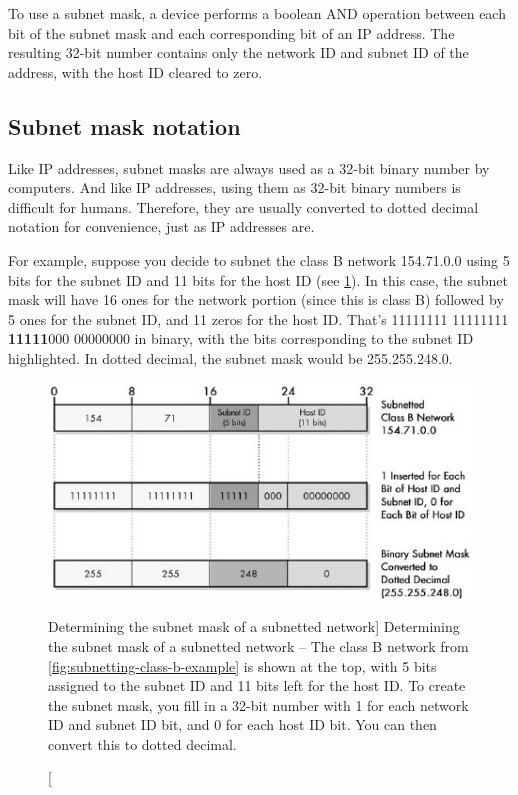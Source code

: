 \begin{keyconcept}
To use a subnet mask, a device performs a boolean AND operation between each bit of the subnet mask and each corresponding bit of an IP address.
The resulting 32-bit number contains only the network ID and subnet ID of the address, with the host ID cleared to zero.
\end{keyconcept}


\subsection{Subnet mask notation}

Like IP addresses, subnet masks are always used as a 32-bit binary number by computers.
And like IP addresses, using them as 32-bit binary numbers is difficult for humans.
Therefore, they are usually converted to dotted decimal notation for convenience, just as IP addresses are.

For example, suppose you decide to subnet the class B network 154.71.0.0 using 5 bits for the subnet ID and 11 bits for the host ID (see \cref{fig:determining-subnet-mask}).
In this case, the subnet mask will have 16 ones for the network portion
(since this is class B) followed by 5 ones for the subnet ID, and 11
zeros for the host ID. That's 11111111 11111111 {\textbf{11111}}000
00000000 in binary, with the bits corresponding to the subnet ID
highlighted. In dotted decimal, the subnet mask would be 255.255.248.0.


\begin{figure}
   \centering
   \includegraphics[width=.7\textwidth]{images/determining-subnet-mask.jpg}
   \caption
      [Determining the subnet mask of a subnetted network]
      {Determining the subnet mask of a subnetted network -- The class B network from \vref{fig:subnetting-class-b-example} is shown at the top,
      with 5 bits assigned to the subnet ID and 11 bits left for the host ID.
      To create the subnet mask, you fill in a 32-bit number with 1 for each network ID and subnet ID bit, and 0 for each host ID bit.
      You can then convert this to dotted decimal.}
   \label{fig:determining-subnet-mask}
\end{figure}



